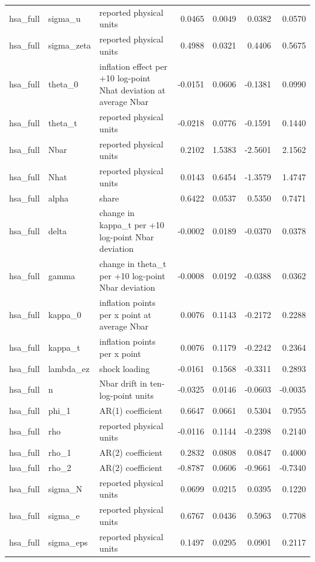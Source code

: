 \begin{tabular}{lllrrrr}
hsa\_full & sigma\_u & reported physical units & 0.0465 & 0.0049 & 0.0382 & 0.0570 \\
hsa\_full & sigma\_zeta & reported physical units & 0.4988 & 0.0321 & 0.4406 & 0.5675 \\
hsa\_full & theta\_0 & inflation effect per +10 log-point Nhat deviation at average Nbar & -0.0151 & 0.0606 & -0.1381 & 0.0990 \\
hsa\_full & theta\_t & reported physical units & -0.0218 & 0.0776 & -0.1591 & 0.1440 \\
hsa\_full & Nbar & reported physical units & 0.2102 & 1.5383 & -2.5601 & 2.1562 \\
hsa\_full & Nhat & reported physical units & 0.0143 & 0.6454 & -1.3579 & 1.4747 \\
hsa\_full & alpha & share & 0.6422 & 0.0537 & 0.5350 & 0.7471 \\
hsa\_full & delta & change in kappa\_t per +10 log-point Nbar deviation & -0.0002 & 0.0189 & -0.0370 & 0.0378 \\
hsa\_full & gamma & change in theta\_t per +10 log-point Nbar deviation & -0.0008 & 0.0192 & -0.0388 & 0.0362 \\
hsa\_full & kappa\_0 & inflation points per x point at average Nbar & 0.0076 & 0.1143 & -0.2172 & 0.2288 \\
hsa\_full & kappa\_t & inflation points per x point & 0.0076 & 0.1179 & -0.2242 & 0.2364 \\
hsa\_full & lambda\_ez & shock loading & -0.0161 & 0.1568 & -0.3311 & 0.2893 \\
hsa\_full & n & Nbar drift in ten-log-point units & -0.0325 & 0.0146 & -0.0603 & -0.0035 \\
hsa\_full & phi\_1 & AR(1) coefficient & 0.6647 & 0.0661 & 0.5304 & 0.7955 \\
hsa\_full & rho & reported physical units & -0.0116 & 0.1144 & -0.2398 & 0.2140 \\
hsa\_full & rho\_1 & AR(2) coefficient & 0.2832 & 0.0808 & 0.0847 & 0.4000 \\
hsa\_full & rho\_2 & AR(2) coefficient & -0.8787 & 0.0606 & -0.9661 & -0.7340 \\
hsa\_full & sigma\_N & reported physical units & 0.0699 & 0.0215 & 0.0395 & 0.1220 \\
hsa\_full & sigma\_e & reported physical units & 0.6767 & 0.0436 & 0.5963 & 0.7708 \\
hsa\_full & sigma\_eps & reported physical units & 0.1497 & 0.0295 & 0.0901 & 0.2117 \\

\end{tabular}
